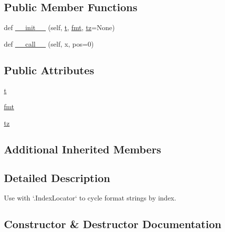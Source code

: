 \subsection*{Public Member Functions}
\begin{DoxyCompactItemize}
\item 
def \hyperlink{classmatplotlib_1_1dates_1_1IndexDateFormatter_aea5d4138604a1d536b43c958c46ba6a1}{\+\_\+\+\_\+init\+\_\+\+\_\+} (self, \hyperlink{classmatplotlib_1_1dates_1_1IndexDateFormatter_a217488ffe924238e8b4a850e60abf513}{t}, \hyperlink{classmatplotlib_1_1dates_1_1IndexDateFormatter_adaf30e0df47f0b1511eea4d7bc3d921e}{fmt}, \hyperlink{classmatplotlib_1_1dates_1_1IndexDateFormatter_a2ac36db86bec907a57fb447ac8a6717d}{tz}=None)
\item 
def \hyperlink{classmatplotlib_1_1dates_1_1IndexDateFormatter_a8d183d30e6206f6c8e80c2145630ef93}{\+\_\+\+\_\+call\+\_\+\+\_\+} (self, x, pos=0)
\end{DoxyCompactItemize}
\subsection*{Public Attributes}
\begin{DoxyCompactItemize}
\item 
\hyperlink{classmatplotlib_1_1dates_1_1IndexDateFormatter_a217488ffe924238e8b4a850e60abf513}{t}
\item 
\hyperlink{classmatplotlib_1_1dates_1_1IndexDateFormatter_adaf30e0df47f0b1511eea4d7bc3d921e}{fmt}
\item 
\hyperlink{classmatplotlib_1_1dates_1_1IndexDateFormatter_a2ac36db86bec907a57fb447ac8a6717d}{tz}
\end{DoxyCompactItemize}
\subsection*{Additional Inherited Members}


\subsection{Detailed Description}
\begin{DoxyVerb}Use with `.IndexLocator` to cycle format strings by index.\end{DoxyVerb}
 

\subsection{Constructor \& Destructor Documentation}
\mbox{\label{classmatplotlib_1_1dates_1_1IndexDateFormatter_aea5d4138604a1d536b43c958c46ba6a1}} 
